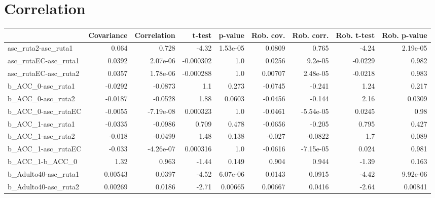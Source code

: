 \section{Correlation}
\begin{tabular}{lrrrrrrrr}
\toprule
{} &  Covariance &  Correlation &    t-test &  p-value &  Rob. cov. &  Rob. corr. &  Rob. t-test &  Rob. p-value \\
\midrule
asc\_ruta2-asc\_ruta1        &       0.064 &        0.728 &     -4.32 & 1.53e-05 &     0.0809 &       0.765 &        -4.24 &      2.19e-05 \\
asc\_rutaEC-asc\_ruta1       &      0.0392 &     2.07e-06 & -0.000302 &      1.0 &     0.0256 &     9.2e-05 &      -0.0229 &         0.982 \\
asc\_rutaEC-asc\_ruta2       &      0.0357 &     1.78e-06 & -0.000288 &      1.0 &    0.00707 &    2.48e-05 &      -0.0218 &         0.983 \\
b\_ACC\_0-asc\_ruta1          &     -0.0292 &      -0.0873 &       1.1 &    0.273 &    -0.0745 &      -0.241 &         1.24 &         0.217 \\
b\_ACC\_0-asc\_ruta2          &     -0.0187 &      -0.0528 &      1.88 &   0.0603 &    -0.0456 &      -0.144 &         2.16 &        0.0309 \\
b\_ACC\_0-asc\_rutaEC         &     -0.0055 &    -7.19e-08 &  0.000323 &      1.0 &    -0.0461 &   -5.54e-05 &       0.0245 &          0.98 \\
b\_ACC\_1-asc\_ruta1          &     -0.0335 &      -0.0986 &     0.709 &    0.478 &    -0.0656 &      -0.205 &        0.795 &         0.427 \\
b\_ACC\_1-asc\_ruta2          &      -0.018 &      -0.0499 &      1.48 &    0.138 &     -0.027 &     -0.0822 &          1.7 &         0.089 \\
b\_ACC\_1-asc\_rutaEC         &      -0.033 &    -4.26e-07 &  0.000316 &      1.0 &    -0.0616 &   -7.15e-05 &        0.024 &         0.981 \\
b\_ACC\_1-b\_ACC\_0            &        1.32 &        0.963 &     -1.44 &    0.149 &      0.904 &       0.944 &        -1.39 &         0.163 \\
b\_Adulto40-asc\_ruta1       &     0.00543 &       0.0397 &     -4.52 & 6.07e-06 &     0.0143 &      0.0915 &        -4.42 &      9.92e-06 \\
b\_Adulto40-asc\_ruta2       &     0.00269 &       0.0186 &     -2.71 &  0.00665 &    0.00667 &      0.0416 &        -2.64 &       0.00841 \\

\end{tabular}
